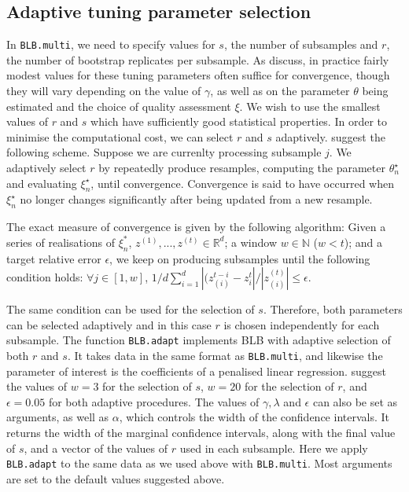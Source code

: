 \documentclass{article}\usepackage[]{graphicx}\usepackage[]{color}
\begin{document}
\subsection{Adaptive tuning parameter selection}
In \texttt{BLB.multi}, we need to specify values for $s$, the number of subsamples and $r$, the number of bootstrap replicates per subsample. As \textcite{Kleiner2014} discuss, in practice fairly modest values for these tuning parameters often suffice for convergence, though they will vary depending on the value of $\gamma$, as well as on the parameter $\theta$ being estimated and the choice of quality assessment $\xi$. We wish to use the smallest values of $r$ and $s$ which have sufficiently good statistical properties. In order to minimise the computational cost, we can select $r$ and $s$ adaptively. \textcite{Kleiner2014} suggest the following scheme. Suppose we are currenlty processing subsample $j$. We adaptively select $r$ by repeatedly produce resamples, computing the parameter $\theta^{\star}_{n}$ and evaluating $\xi^{\star}_{n}$, until convergence. Convergence is said to have occurred when $\xi^{\star}_{n}$ no longer changes significantly after being updated from a new resample.

The exact measure of convergence is given by the following algorithm: Given a series of realisations of $\xi_n^*$, $ z^{(1)} ,..., z^{(t)}\in \mathbb{R}^{d}$; a window $w \in \mathbb{N}$ ($ w<t $); and a target relative error $\epsilon$,  we keep on producing subsamples until the following condition holds: $\forall j \in [1,w]$,
$ 1/d \sum_{i=1}^{d} | (z_{(i)}^{t-i}-z_{i}^{t} | / |z_{(i)}^{(t)} | \leq \epsilon $.

The same condition can be used for the selection of $s$. Therefore, both parameters can be selected adaptively and in this case $r$ is chosen independently for each subsample. The function \texttt{BLB.adapt} implements BLB with adaptive selection of both $r$ and $s$. It takes data in the same format as \texttt{BLB.multi}, and likewise the parameter of interest is the coefficients of a penalised linear regression. \textcite{Kleiner2014} suggest the values of $w=3$ for the selection of $s$, $w=20$ for the selection of $r$, and $\epsilon=0.05$ for both adaptive procedures. The values of $\gamma, \lambda$ and $\epsilon$ can also be set as arguments, as well as $\alpha$, which controls the width of the confidence intervals. It returns the width of the marginal confidence intervals, along with the final value of $s$, and a vector of the values of $r$ used in each subsample. Here we apply \texttt{BLB.adapt} to the same data as we used above with \texttt{BLB.multi}. Most arguments are set to the default values suggested above.
\end{document}
